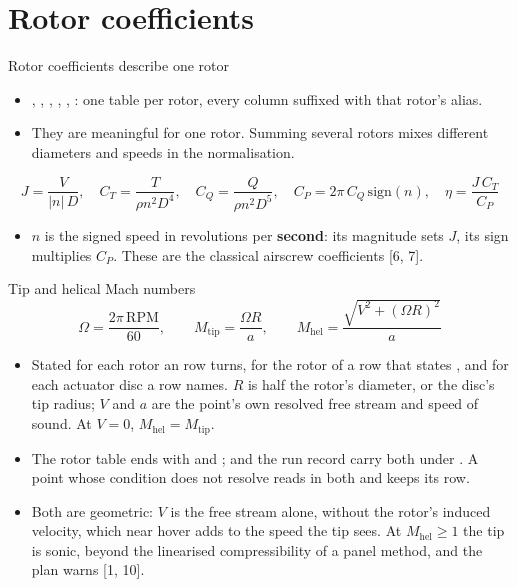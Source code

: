 %
\section{Rotor coefficients}

\begin{frame}{Rotor coefficients describe one rotor}
\begin{itemize}
  \item {}, , , , , :
        one table per rotor, every column suffixed with that rotor's alias.
  \item They are meaningful for one rotor. Summing several rotors mixes
        different diameters and speeds in the normalisation.
\end{itemize}
\[
  J = \frac{V}{|n|\,D}, \quad
  C_T = \frac{T}{\rho n^2 D^4}, \quad
  C_Q = \frac{Q}{\rho n^2 D^5}, \quad
  C_P = 2\pi\,C_Q\,\mathrm{sign}(n), \quad
  \eta = \frac{J\,C_T}{C_P}
\]
\begin{itemize}\small
  \item \(n\) is the signed speed in revolutions per \textbf{second}: its
        magnitude sets \(J\), its sign multiplies \(C_P\). These are the
        classical airscrew coefficients [6, 7].
\end{itemize}
\end{frame}

\begin{frame}{Tip and helical Mach numbers}
\[ \Omega = \frac{2\pi\,\mathrm{RPM}}{60}, \qquad
   M_\mathrm{tip} = \frac{\Omega R}{a}, \qquad
   M_\mathrm{hel} = \frac{\sqrt{V^2 + (\Omega R)^2}}{a} \]
\begin{itemize}\small
  \item Stated for each rotor an  row turns, for the
        rotor of a  row that states , and for each
        actuator disc a row names. \(R\) is half the rotor's diameter, or the
        disc's tip radius; \(V\) and \(a\) are the point's own resolved free
        stream and speed of sound. At \(V = 0\), \(M_\mathrm{hel} =
        M_\mathrm{tip}\).
  \item The rotor table ends with  and
        ;  and the run record carry both
        under . A point whose condition does not resolve
        reads  in both and keeps its row.
  \item Both are geometric: \(V\) is the free stream alone, without the
        rotor's induced velocity, which near hover adds to the speed the tip
        sees. At \(M_\mathrm{hel} \ge 1\) the tip is sonic, beyond the
        linearised compressibility of a panel method, and the plan warns
        [1, 10].
\end{itemize}
\end{frame}

